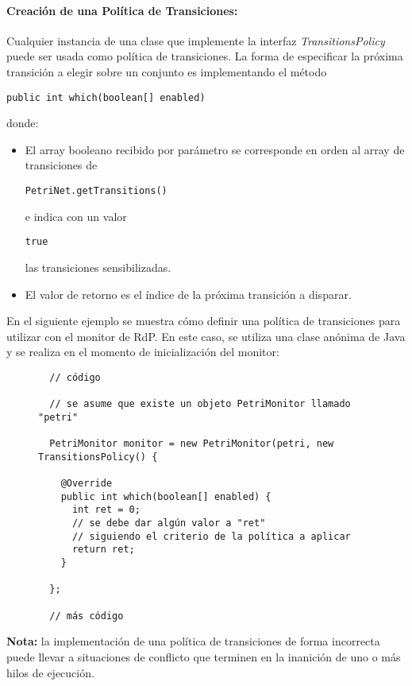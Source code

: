 \paragraph{Creación de una Política de Transiciones:}
Cualquier instancia de una clase que implemente la interfaz
\textit{TransitionsPolicy} puede ser usada como política de transiciones.
La forma de especificar la próxima transición a elegir sobre un conjunto es
implementando el método {
\begin{verbatim}
public int which(boolean[] enabled)
\end{verbatim}
} donde:
\begin{itemize}
    \item El array booleano recibido por parámetro se corresponde en orden al
    array de transiciones de {
    \begin{verbatim}
PetriNet.getTransitions()
    \end{verbatim}
    } e indica con un valor {
    \begin{verbatim}
true
    \end{verbatim}
    } las transiciones sensibilizadas.
    \item El valor de retorno es el índice de la próxima transición a disparar.
\end{itemize}

En el siguiente ejemplo se muestra cómo definir una política de transiciones
para utilizar con el monitor de RdP. En este caso, se utiliza una clase anónima
de Java y se realiza en el momento de inicialización del monitor:

\begin{figure}[H]
\centering
\begin{verbatim}
  // código
  
  // se asume que existe un objeto PetriMonitor llamado "petri"
  
  PetriMonitor monitor = new PetriMonitor(petri, new TransitionsPolicy() {
  
    @Override
    public int which(boolean[] enabled) {
      int ret = 0;
      // se debe dar algún valor a "ret"
      // siguiendo el criterio de la política a aplicar
      return ret;
    }
    
  };
  
  // más código
\end{verbatim}
\end{figure}

\begin{framed}
\textbf{Nota:} la implementación de una política de transiciones de forma
incorrecta puede llevar a situaciones de conflicto que terminen en la inanición
de uno o más hilos de ejecución.
\end{framed}
